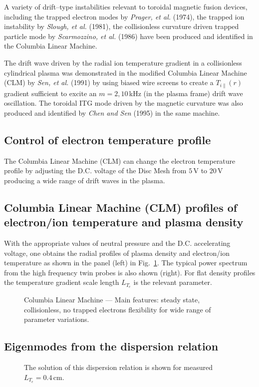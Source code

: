 \documentclass[a4paper,openany,12pt]{book}
\begin{document}
A variety of drift--type instabilities relevant to toroidal magnetic fusion devices, including the trapped electron modes by \emph{Prager, et al.} (1974), the trapped ion instability by \emph{Slough, et al.} (1981), the collisionless curvature driven trapped particle mode by \emph{Scarmozzino, et al.} (1986) have been produced and identified in the Columbia Linear Machine.

The drift wave driven by the radial ion temperature gradient in a collisionless cylindrical plasma was demonstrated in the modified Columbia Linear Machine (CLM) by \emph{Sen, et al.} (1991) by using biased wire screens to create a $T_{i\|}(r)$ gradient sufficient to excite an $m=2,10\,$kHz (in the plasma frame) drift wave oscillation. The toroidal ITG mode driven by the magnetic curvature was also produced and identified by \emph{Chen and Sen} (1995) in the same machine.

\subsection{Control of electron temperature profile}

The Columbia Linear Machine (CLM) can change the electron temperature profile by adjusting the D.C. voltage of the Disc Mesh from $5\,$V to $20\,$V producing a wide range of drift waves in the plasma.

\subsection{Columbia Linear Machine (CLM) profiles of electron/ion temperature and plasma density}

With the appropriate values of neutral pressure and the D.C. accelerating voltage, one obtains the radial profiles of plasma density and electron/ion temperature as shown in the panel (left) in 
Fig.~\ref{F9.12}. The typical power spectrum from the high frequency twin probes is also shown (right). For flat density profiles the temperature gradient scale length $L_{T_e}$ is the relevant parameter.
%
\begin{figure}[H]
\centerline{}
\caption{Columbia Linear Machine --- Main features: steady state, collisionless, no trapped electrons flexibility for wide range of parameter variations.}
\label{F9.12}
\end{figure}
%
\subsection{Eigenmodes from the dispersion relation}
%
\begin{figure}[H]
\centerline{}
\caption{The solution of this dispersion relation is shown for measured 
$L_{T_e} = 0.4\,$cm.}
\label{F9.14}
\end{figure}
\end{document}
